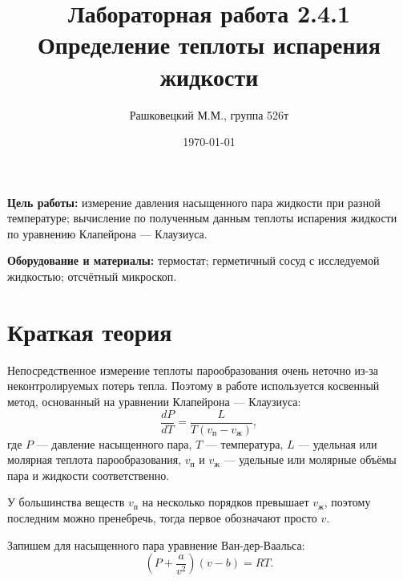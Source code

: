 \documentclass[12pt]{article}
\author{Рашковецкий М.М., группа 526т}
\date{\today}
\title{Лабораторная работа 2.4.1\\Определение теплоты испарения жидкости}
\begin{document}
	\maketitle
	
	{\parindent=1cm \hangindent=1cm \parskip=0.5cm
	{\bfseries Цель работы:} измерение давления насыщенного пара жидкости при разной температуре; вычисление по полученным данным теплоты испарения жидкости по уравнению Клапейрона --- Клаузиуса.
	
	\hangindent=1cm
	{\bfseries Оборудование и материалы:} термостат; герметичный сосуд с исследуемой жидкостью; отсчётный микроскоп.\par}
	\section*{Краткая теория}
	
	\indent Непосредственное измерение теплоты парообразования очень неточно из-за неконтролируемых потерь тепла. Поэтому в работе используется косвенный метод, основанный на уравнении Клапейрона --- Клаузиуса:
	\begin{equation}
		\label{eq:klapeiron-klausius}
		\frac{dP}{dT}=\frac{L}{T \left( v_\text{п} - v_\text{ж} \right) },
	\end{equation}
	где $P$ --- давление насыщенного пара, $T$ --- температура, $L$ --- удельная или молярная теплота парообразования, $v_\text{п}$ и $v_\text{ж}$ --- удельные или молярные объёмы пара и жидкости соответственно.
	
	У большинства веществ $v_\text{п}$ на несколько порядков превышает $v_\text{ж}$, поэтому последним можно пренебречь, тогда первое обозначают просто $v$.
	
	Запишем для насыщенного пара уравнение Ван-дер-Ваальса:
	\begin{equation}
		\label{eq:van-der-vaals}
		\left( P + \frac{a}{v^2} \right) \left( v - b \right) = RT.
	\end{equation}
	
\end{document}

